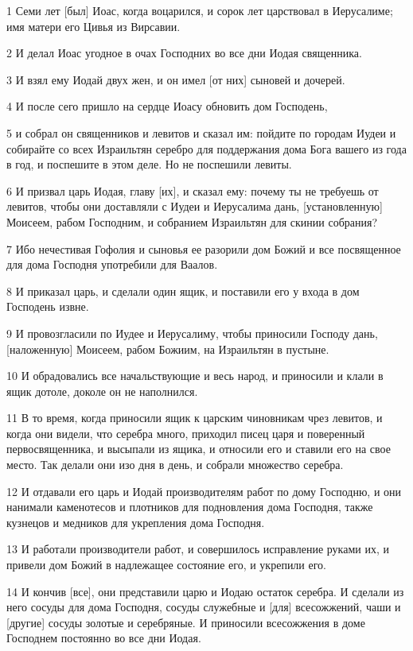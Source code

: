 \par 1 Семи лет [был] Иоас, когда воцарился, и сорок лет царствовал в Иерусалиме; имя матери его Цивья из Вирсавии.
\par 2 И делал Иоас угодное в очах Господних во все дни Иодая священника.
\par 3 И взял ему Иодай двух жен, и он имел [от них] сыновей и дочерей.
\par 4 И после сего пришло на сердце Иоасу обновить дом Господень,
\par 5 и собрал он священников и левитов и сказал им: пойдите по городам Иудеи и собирайте со всех Израильтян серебро для поддержания дома Бога вашего из года в год, и поспешите в этом деле. Но не поспешили левиты.
\par 6 И призвал царь Иодая, главу [их], и сказал ему: почему ты не требуешь от левитов, чтобы они доставляли с Иудеи и Иерусалима дань, [установленную] Моисеем, рабом Господним, и собранием Израильтян для скинии собрания?
\par 7 Ибо нечестивая Гофолия и сыновья ее разорили дом Божий и все посвященное для дома Господня употребили для Ваалов.
\par 8 И приказал царь, и сделали один ящик, и поставили его у входа в дом Господень извне.
\par 9 И провозгласили по Иудее и Иерусалиму, чтобы приносили Господу дань, [наложенную] Моисеем, рабом Божиим, на Израильтян в пустыне.
\par 10 И обрадовались все начальствующие и весь народ, и приносили и клали в ящик дотоле, доколе он не наполнился.
\par 11 В то время, когда приносили ящик к царским чиновникам чрез левитов, и когда они видели, что серебра много, приходил писец царя и поверенный первосвященника, и высыпали из ящика, и относили его и ставили его на свое место. Так делали они изо дня в день, и собрали множество серебра.
\par 12 И отдавали его царь и Иодай производителям работ по дому Господню, и они нанимали каменотесов и плотников для подновления дома Господня, также кузнецов и медников для укрепления дома Господня.
\par 13 И работали производители работ, и совершилось исправление руками их, и привели дом Божий в надлежащее состояние его, и укрепили его.
\par 14 И кончив [все], они представили царю и Иодаю остаток серебра. И сделали из него сосуды для дома Господня, сосуды служебные и [для] всесожжений, чаши и [другие] сосуды золотые и серебряные. И приносили всесожжения в доме Господнем постоянно во все дни Иодая.
